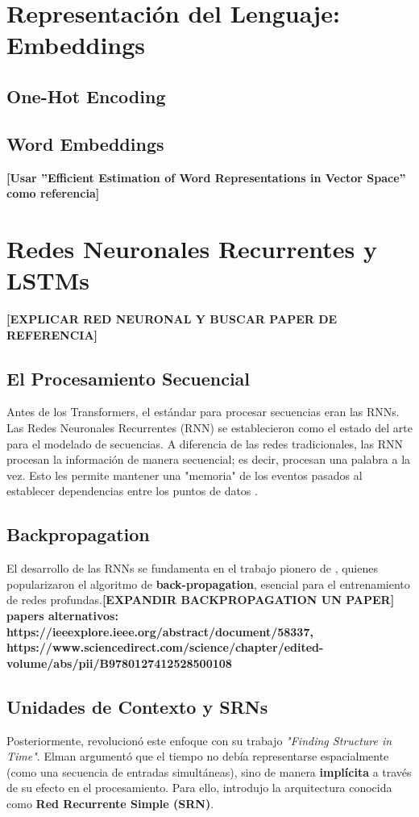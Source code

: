 \documentclass[11pt, a4paper]{article}
\begin{document}
\section{Representación del Lenguaje: Embeddings}
\subsection{One-Hot Encoding}
\subsection{Word Embeddings}
\textbf{[Usar ''Efficient Estimation of Word Representations in
Vector Space'' como referencia]}

\section{Redes Neuronales Recurrentes y LSTMs}

\textbf{[EXPLICAR RED NEURONAL Y BUSCAR PAPER DE REFERENCIA]}

\subsection{El Procesamiento Secuencial}
Antes de los Transformers, el estándar para procesar secuencias eran las RNNs.
Las Redes Neuronales Recurrentes (RNN) se establecieron como el estado del arte para el modelado de secuencias. A diferencia de las redes tradicionales, las RNN procesan la información
de manera secuencial; es decir, procesan una palabra a la vez. Esto les permite mantener una "memoria" de los eventos pasados al establecer dependencias entre los puntos de datos 
\parencite{atkinson2025}. 
\subsection{Backpropagation}
El desarrollo de las RNNs se fundamenta en el trabajo pionero de \textcite{rumelhart1986}, quienes popularizaron el algoritmo de \textbf{back-propagation}, esencial para el entrenamiento 
de redes profundas.\textbf{[EXPANDIR BACKPROPAGATION UN PAPER] papers alternativos: https://ieeexplore.ieee.org/abstract/document/58337, https://www.sciencedirect.com/science/chapter/edited-volume/abs/pii/B9780127412528500108} 

\subsection{Unidades de Contexto y SRNs}
Posteriormente, \textcite{elman1990} revolucionó este enfoque con su trabajo \textit{"Finding Structure in Time"}. Elman argumentó que el tiempo no debía representarse espacialmente
(como una secuencia de entradas simultáneas), sino de manera \textbf{implícita} a través de su efecto en el procesamiento. Para ello, introdujo la arquitectura conocida como 
\textbf{Red Recurrente Simple (SRN)}. 
\end{document}

